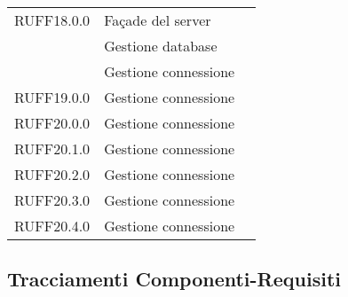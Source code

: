 \begin{center}
\begin{longtable}{lp{}l}
RUFF18.0.0 & Façade del server \\
 & Gestione database \\
 & Gestione connessione \\
RUFF19.0.0 & Gestione connessione \\
RUFF20.0.0 & Gestione connessione \\
RUFF20.1.0 & Gestione connessione \\
RUFF20.2.0 & Gestione connessione \\
RUFF20.3.0 & Gestione connessione \\
RUFF20.4.0 & Gestione connessione \\
\bottomrule
\end{longtable}
\end{center}
\subsection{Tracciamenti Componenti-Requisiti}\label{sec:tracCompRec}

